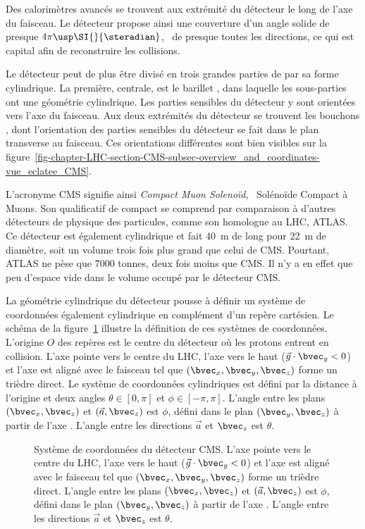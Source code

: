 Des calorimètres avancés se trouvent aux extrémité du détecteur le long de l'axe du faisceau.
Le détecteur propose ainsi une couverture d'un angle solide de presque $4\pi\usp\SI{}{\steradian}$, \ie\ de presque toutes les directions, ce qui est capital afin de reconstruire les collisions.
\par Le détecteur peut de plus être divisé en trois grandes parties de par sa forme cylindrique.
La première, centrale, est le \og barillet \fg, dans laquelle les sous-parties ont une géométrie cylindrique.
Les parties sensibles du détecteur y sont orientées vers l'axe du faisceau.
Aux deux extrémités du détecteur se trouvent les \og bouchons \fg, dont l'orientation des parties sensibles du détecteur se fait dans le plan transverse au faisceau.
Ces orientations différentes sont bien visibles sur la figure~\ref{fig-chapter-LHC-section-CMS-subsec-overview_and_coordinates-vue_eclatee_CMS}.
\par L'acronyme CMS signifie ainsi \emph{Compact Muon Solenoïd}, \ie\ Solénoïde Compact à Muons.
Son qualificatif de \og compact \fg{} se comprend par comparaison à d'autres détecteurs de physique des particules, comme son homologue au LHC, ATLAS.
Ce détecteur est également cylindrique et fait \SI{40}{\meter} de long pour \SI{22}{\meter} de diamètre, soit un volume trois fois plus grand que celui de CMS.
Pourtant, ATLAS ne pèse \og que \fg{} \num{7000} tonnes, deux fois moins que CMS.
Il n'y a en effet que peu d'espace vide dans le volume occupé par le détecteur CMS.
\par La géométrie cylindrique du détecteur pousse à définir un système de coordonnées également cylindrique en complément d'un repère cartésien.
Le schéma de la figure~\ref{fig-chapter-LHC-section-CMS-subsec-overview_and_coordinates-CMS_3D_phi_theta_defs} illustre la définition de ces systèmes de coordonnées.
L'origine $O$ des repères est le centre du détecteur où les protons entrent en collision.
L'axe  pointe vers le centre du LHC, l'axe  vers le haut ($\vec{g}\cdot\bvec_y<0$) et l'axe  est aligné avec le faisceau tel que $(\bvec_x, \bvec_y, \bvec_z)$ forme un trièdre direct.
Le système de coordonnées cylindriques est défini par la distance à l'origine et deux angles $\theta\in[0,\pi]$ et $\phi\in[-\pi,\pi]$.
L'angle entre les plans $(\bvec_x, \bvec_z)$ et $(\vec{a}, \bvec_z)$ est $\phi$, défini dans le plan $(\bvec_y,\bvec_z)$ à partir de l'axe .
L'angle entre les directions $\vec{a}$ et $\bvec_z$ est $\theta$.
\begin{figure}[h]
\centering

\caption[Système de coordonnées du détecteur CMS.]{Système de coordonnées du détecteur CMS. L'axe  pointe vers le centre du LHC, l'axe  vers le haut ($\vec{g}\cdot\bvec_y<0$) et l'axe  est aligné avec le faisceau tel que $(\bvec_x, \bvec_y, \bvec_z)$ forme un trièdre direct. L'angle entre les plans $(\bvec_x, \bvec_z)$ et $(\vec{a}, \bvec_z)$ est $\phi$, défini dans le plan $(\bvec_y,\bvec_z)$ à partir de l'axe . L'angle entre les directions $\vec{a}$ et $\bvec_z$ est $\theta$.}
\label{fig-chapter-LHC-section-CMS-subsec-overview_and_coordinates-CMS_3D_phi_theta_defs}
\end{figure}

